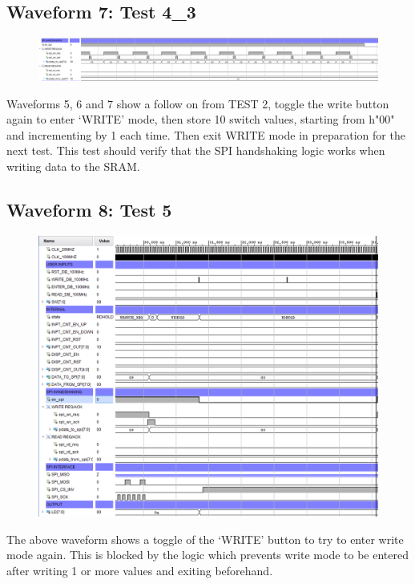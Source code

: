 \documentclass[11pt]{report}
\begin{document}
\subsection*{Waveform 7: Test 4\_3}
\begin{figure}[H]
    \includegraphics[width=\columnwidth]{Assets/Test4_3.PNG}
\end{figure}

Waveforms 5, 6 and 7 show a follow on from TEST 2, toggle the write button again to enter `WRITE' mode, then store 10 switch values, starting from h"00" and incrementing by 1 each time. Then exit WRITE mode in preparation for the next test. This test should verify that the SPI handshaking logic works when writing data to the SRAM.

\subsection*{Waveform 8: Test 5}
\begin{figure}[H]
    \includegraphics[width=\columnwidth]{Assets/Test5.PNG}
\end{figure}

The above waveform shows a toggle of the `WRITE' button to try to enter write mode again. This is blocked by the logic which prevents write mode to be entered after writing 1 or more values and exiting beforehand.
\end{document}
